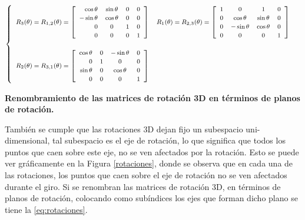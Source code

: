 \begin{equation}
\label{eq:rotaciones}
\footnotesize{
   \begin{cases}
   \begin{array}{rccl}
    
    R_3(\theta) = R_{1,2}(\theta)
    =
    \left[
    \begin{array}{rccl}
    \cos\theta & \sin\theta & 0 & 0\\
    -\sin\theta & \cos\theta & 0  &  0\\
    0 & 0 & 1 & 0 \\
    0 & 0 & 0 & 1\\
    \end{array}
    \right]
   
    &
    R_1(\theta) = R_{2,3}(\theta)
    =
    \left[
    \begin{array}{rccl}
    1 & 0 & 1 & 0\\
    0 & \cos\theta & \sin\theta &  0\\
    0 & -\sin\theta & \cos\theta & 0 \\
    0 & 0 & 0 & 1\\
    \end{array}
    \right]
    \\ \\
    R_2(\theta) = R_{3,1}(\theta)
    =
    \left[
    \begin{array}{rccl}
    \cos\theta & 0 & -\sin\theta & 0\\
    0 & 1 & 0 &  0\\
    \sin\theta & 0 & \cos\theta & 0 \\
    0 & 0 & 0 & 1\\
    \end{array}
    \right]
    
    \end{array}
\end{cases}
}
\end{equation}


\begin{center}
\caption{\footnotesize{\textbf{Renombramiento de las matrices de rotación 3D en términos de planos de rotación.}}}
\end{center}
    
También se cumple que las rotaciones 3D dejan fijo un subespacio uni-dimensional, 
tal subespacio es el eje de rotación, lo que significa que todos los puntos que 
caen sobre este eje, no se ven afectados por la rotación. Esto se puede ver 
gráficamente en la Figura \ref{rotaciones}, donde se observa que en cada una 
de las rotaciones, los puntos que caen sobre el eje de rotación no se ven afectados 
durante el giro. Si se renombran las matrices de rotación 3D, en términos de planos 
de rotación, colocando como subíndices los ejes que forman dicho plano se tiene la \ref{eq:rotaciones}.

